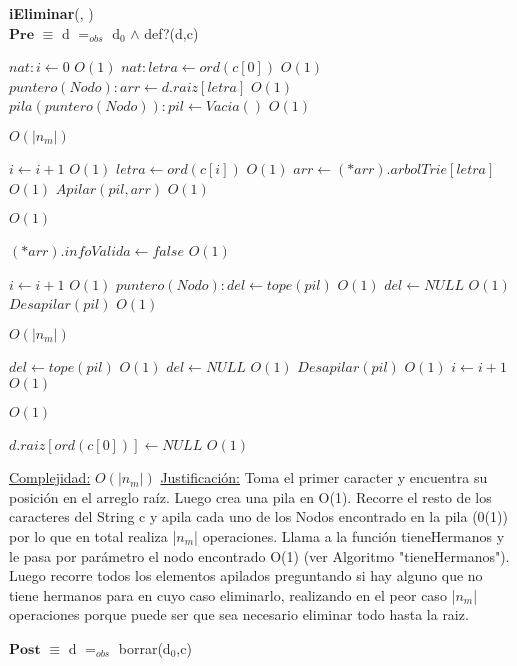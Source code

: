 \begin{algorithm}[H]{\textbf{iEliminar}(, )}
	{\\ $\textbf{Pre}$ $\equiv$ d $=_{obs}$ d$_0$ $\land$ def?(d,c)}
	\begin{algorithmic}

		\State $nat: i \gets 0$ \Comment $O(1)$
		\State $nat: letra \gets ord(c[0])$ \Comment $O(1)$
		\State $puntero(Nodo): arr \gets d.raiz[letra]$ \Comment $O(1)$
		\State $pila(puntero(Nodo)): pil \gets Vacia()$ \Comment $O(1)$

		 \Comment $O(|n_m|)$

			\State $i \gets i + 1$ \Comment $O(1)$
			\State $letra \gets ord(c[i])$ \Comment $O(1)$
			\State $arr \gets (*arr).arbolTrie[letra]$ \Comment $O(1)$
			\State $Apilar(pil,arr)$ \Comment $O(1)$

		\EndWhile

		 \Comment $O(1)$

			\State $(*arr).infoValida \gets false$ \Comment $O(1)$

		\Else

			\State $i \gets i + 1$ \Comment $O(1)$
			\State $puntero(Nodo): del \gets tope(pil)$ \Comment $O(1)$
			\State $del \gets NULL$ \Comment $O(1)$
			\State $Desapilar(pil)$ \Comment $O(1)$

			 \Comment $O(|n_m|)$

				\State $del \gets tope(pil)$ \Comment $O(1)$
				\State $del \gets NULL$ \Comment $O(1)$
				\State $Desapilar(pil)$ \Comment $O(1)$
				\State $i \gets i + 1$ \Comment $O(1)$

			\EndWhile

			 \Comment $O(1)$

				\State $d.raiz[ord(c[0])] \gets NULL$ \Comment $O(1)$

			\EndIf

		\EndIf

		\medskip
		\Statex \underline{Complejidad:} $O(|n_m|)$
		\Statex \underline{Justificación:} Toma el primer caracter y encuentra su posición en el arreglo raíz. Luego crea una pila en O(1). Recorre el resto de los caracteres del String c y apila cada uno de los Nodos encontrado en la pila (0(1)) por lo que en total realiza |$n_m$| operaciones. Llama a la función tieneHermanos y le pasa por parámetro el nodo encontrado O(1) (ver Algoritmo "tieneHermanos"). Luego recorre todos los elementos apilados preguntando si hay alguno que no tiene hermanos para en cuyo caso eliminarlo, realizando en el peor caso |$n_m$| operaciones porque puede ser que sea necesario eliminar todo hasta la raiz.

    \end{algorithmic}
    {$\textbf{Post}$ $\equiv$ d $=_{obs}$ borrar(d$_0$,c)}
\end{algorithm}


